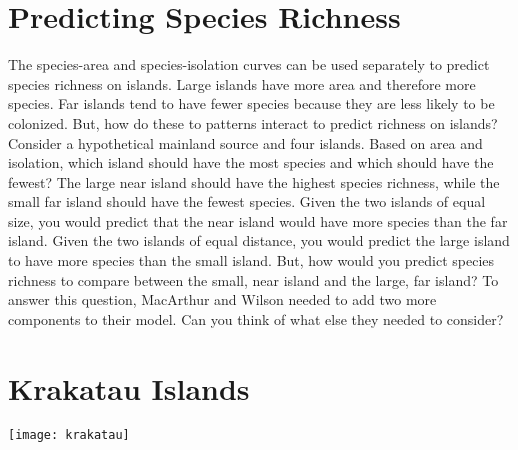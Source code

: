 \documentclass[letterpaper]{tufte-handout}
\begin{document}
\section{Predicting Species Richness}
\begin{marginfigure}%
\end{marginfigure} 

The species-area and species-isolation curves can be used separately to predict species richness on islands. Large islands have more area and therefore more species. Far islands tend to have fewer species because they are less likely to be colonized.  But, how do these to patterns interact to predict richness on islands? 
Consider a hypothetical mainland source and four islands. Based on area and isolation, which island should have the most species and which should have the fewest? The large near island should have the highest species richness, while the small far island should have the fewest species.  Given the two islands of equal size, you would predict that the near island would have more species than the far island. Given the two islands of equal distance, you would predict the large island to have more species than the small island.  But, how would you predict species richness to compare between the small, near island and the large, far island?  To answer this question, MacArthur and Wilson needed to add two more components to their model. Can you think of what else they needed to consider?

\section{Krakatau Islands}

\begin{marginfigure}%
	\centering
	\texttt{[image: krakatau]}
\end{marginfigure} 
\end{document}
